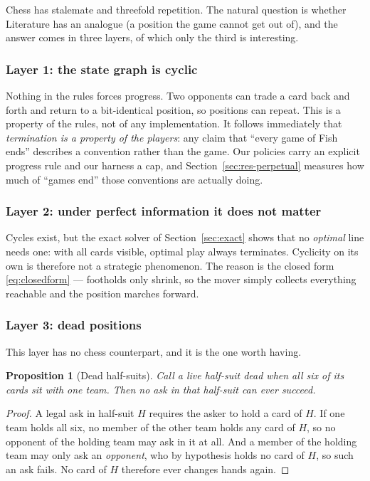 \documentclass[11pt,letterpaper]{article}
\newtheorem{proposition}{Proposition}
\begin{document}
Chess has stalemate and threefold repetition. The natural question is whether
Literature has an analogue (a position the game cannot get out of), and the
answer comes in three layers, of which only the third is interesting.

\subsubsection{Layer 1: the state graph is cyclic}

Nothing in the rules forces progress. Two opponents can trade a card back and
forth and return to a bit-identical position, so positions can repeat. This is a
property of the rules, not of any implementation. It follows immediately that
\emph{termination is a property of the players}: any claim that ``every game of
Fish ends'' describes a convention rather than the game. Our policies carry an
explicit progress rule and our harness a cap, and Section~\ref{sec:res-perpetual}
measures how much of ``games end'' those conventions are actually doing.

\subsubsection{Layer 2: under perfect information it does not matter}

Cycles exist, but the exact solver of Section~\ref{sec:exact} shows that no
\emph{optimal} line needs one: with all cards visible, optimal play always
terminates. Cyclicity on its own is therefore not a strategic phenomenon. The
reason is the closed form \eqref{eq:closedform} --- footholds only shrink, so the
mover simply collects everything reachable and the position marches forward.

\subsubsection{Layer 3: dead positions}

This layer has no chess counterpart, and it is the one worth having.

\begin{proposition}[Dead half-suits]
\label{prop:dead}
Call a live half-suit \emph{dead} when all six of its cards sit with one team.
Then no ask in that half-suit can ever succeed.
\end{proposition}

\begin{proof}
A legal ask in half-suit $H$ requires the asker to hold a card of $H$. If one
team holds all six, no member of the other team holds any card of $H$, so no
opponent of the holding team may ask in it at all. And a member of the holding
team may only ask an \emph{opponent}, who by hypothesis holds no card of $H$, so
such an ask fails. No card of $H$ therefore ever changes hands again.
\end{proof}
\end{document}
